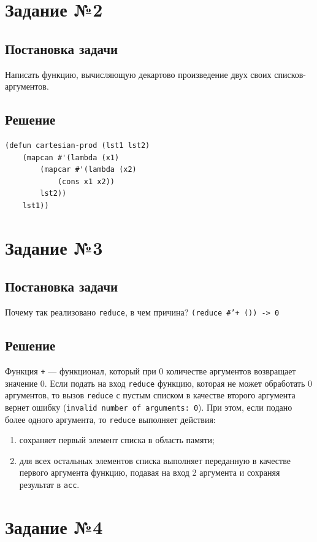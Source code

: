 \documentclass[12pt]{report}
\begin{document}
\section*{Задание №2}
\subsection*{Постановка задачи}
Написать функцию, вычисляющую декартово произведение двух своих списков-аргументов.

\subsection*{Решение}
\begin{lstlisting}
(defun cartesian-prod (lst1 lst2)
	(mapcan #'(lambda (x1)
		(mapcar #'(lambda (x2)
			(cons x1 x2))
		lst2))
	lst1))
\end{lstlisting}


\section*{Задание №3}
\subsection*{Постановка задачи}
Почему так реализовано \texttt{reduce}, в чем причина? \texttt{(reduce \#'+ ()) -> 0}

\subsection*{Решение}
Функция \texttt{+} --- функционал, который при 0 количестве аргументов возвращает значение 0. Если подать на вход \texttt{reduce} функцию, которая не может обработать 0 аргументов, то вызов \texttt{reduce} с пустым списком в качестве второго аргумента вернет ошибку (\texttt{invalid number of arguments: 0}). При этом, если подано более одного аргумента, то \texttt{reduce} выполняет действия:

\begin{enumerate}
	\item сохраняет первый элемент списка в область памяти;
	\item для всех остальных элементов списка выполняет переданную в качестве первого аргумента функцию, подавая на вход 2 аргумента и сохраняя результат в \texttt{acc}.
\end{enumerate}

\section*{Задание №4}
\end{document}

